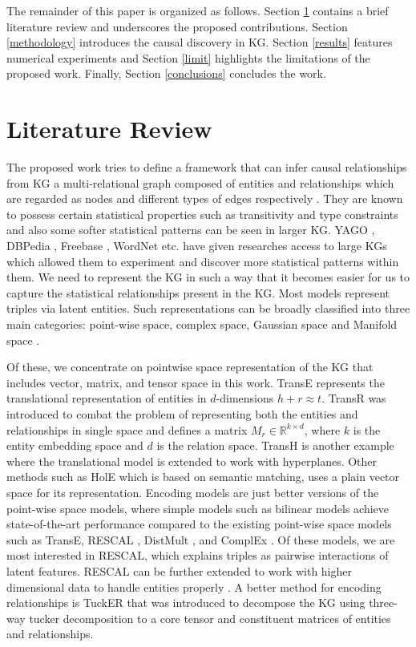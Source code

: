 \documentclass{article}
\begin{document}
The remainder of this paper is organized as follows. Section \ref{lit_review} contains a brief literature review and underscores the proposed contributions. Section \ref{methodology} introduces the causal discovery in KG. Section \ref{results} features numerical experiments and Section \ref{limit} highlights the limitations of the proposed work. Finally, Section \ref{conclusions} concludes the work.


\section{Literature Review} 
\label{lit_review}
The proposed work tries to define a framework that can infer causal relationships from KG \textemdash a multi-relational graph composed of entities and relationships which are regarded as nodes and different types of edges respectively \cite{wang2017knowledge}. They are known to possess certain statistical properties such as transitivity and type constraints \cite{Ji2021tnnls} and also some softer statistical patterns can be seen in larger KG. YAGO \cite{yago}, DBPedia \cite{dbpedia}, Freebase \cite{fb15k}, WordNet \cite{fb15k} etc. have given researches access to large KGs which allowed them to experiment and discover more statistical patterns within them. We need to represent the KG in such a way that it becomes easier for us to capture the statistical relationships present in the KG. Most models represent triples via latent entities. Such representations can be broadly classified into three main categories: point-wise space, complex space, Gaussian space and Manifold space \cite{Ji2021tnnls}.


Of these, we concentrate on pointwise space representation of the KG that includes vector, matrix, and tensor space in this work. TransE \cite{fb15k} represents the translational representation of entities in $d$-dimensions $h+r \approx t$. TransR \cite{TransR} was introduced to combat the problem of representing both the entities and relationships in single space and defines a matrix $M_r \in \mathbb{R}^{k  \times d}$, where $k$ is the entity embedding space and $d$ is the relation space. TransH \cite{wang2014knowledge} is another example where the translational model is extended to work with hyperplanes. Other methods such as HolE \cite{HolE} which is based on semantic matching, uses a plain vector space for its representation.  Encoding models are just better versions of the point-wise space models, where simple models such as bilinear models \cite{NIPS2012_0a1bf96b} achieve state-of-the-art performance compared to the existing point-wise space models such as TransE, RESCAL \cite{rescal}, DistMult \cite{yang2015embedding}, and ComplEx \cite{ComplEx}. Of these models, we are most interested in RESCAL, which explains triples as pairwise interactions of latent features. RESCAL can be further extended to work with higher dimensional data to handle entities properly \cite{yago_factorizing}. A better method for encoding relationships is TuckER that was introduced to decompose the KG using three-way tucker decomposition \cite{Balazevic2019} to a core tensor and constituent matrices of entities and relationships.
\end{document}

